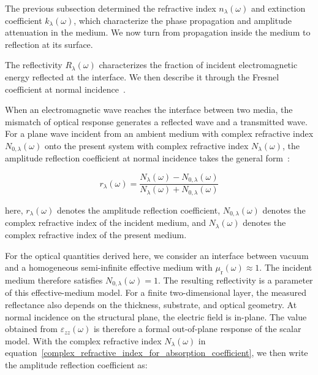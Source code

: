 The previous subsection determined the refractive index $n_{\lambda}(\omega)$ and extinction coefficient $k_{\lambda}(\omega)$,
which characterize the phase propagation and amplitude attenuation in the medium.
We now turn from propagation inside the medium to reflection at its surface.

The reflectivity $R_{\lambda}(\omega)$ characterizes the fraction of incident electromagnetic energy reflected at the interface.
We then describe it through the Fresnel coefficient at normal incidence~\cite{born2013principles,wooten2013optical,dressel2002electrodynamics,fox2010optical}.

When an electromagnetic wave reaches the interface between two media,
the mismatch of optical response generates a reflected wave and a transmitted wave.
For a plane wave incident from an ambient medium with complex refractive index $N_{0,\lambda}(\omega)$ onto the present system with complex refractive index $N_{\lambda}(\omega)$,
the amplitude reflection coefficient at normal incidence takes the general form~\cite{born2013principles,wooten2013optical}:

\begin{equation}
    r_{\lambda}(\omega) =
    \frac{N_{\lambda}(\omega)-N_{0,\lambda}(\omega)}
    {N_{\lambda}(\omega)+N_{0,\lambda}(\omega)}
\label{normal_incidence_amplitude_reflection_coefficient_general}
\end{equation}

here, $r_{\lambda}(\omega)$ denotes the amplitude reflection coefficient,
$N_{0,\lambda}(\omega)$ denotes the complex refractive index of the incident medium,
and $N_{\lambda}(\omega)$ denotes the complex refractive index of the present medium.

For the optical quantities derived here,
we consider an interface between vacuum and a homogeneous semi-infinite effective medium with $\mu_{\mathrm{r}}(\omega)\approx1$.
The incident medium therefore satisfies $N_{0,\lambda}(\omega)=1$.
The resulting reflectivity is a parameter of this effective-medium model.
For a finite two-dimensional layer, the measured reflectance also depends on the thickness, substrate, and optical geometry.
At normal incidence on the structural plane, the electric field is in-plane.
The value obtained from $\varepsilon_{zz}(\omega)$ is therefore a formal out-of-plane response of the scalar model.
With the complex refractive index $N_{\lambda}(\omega)$ in equation~\eqref{complex_refractive_index_for_absorption_coefficient},
we then write the amplitude reflection coefficient as:


